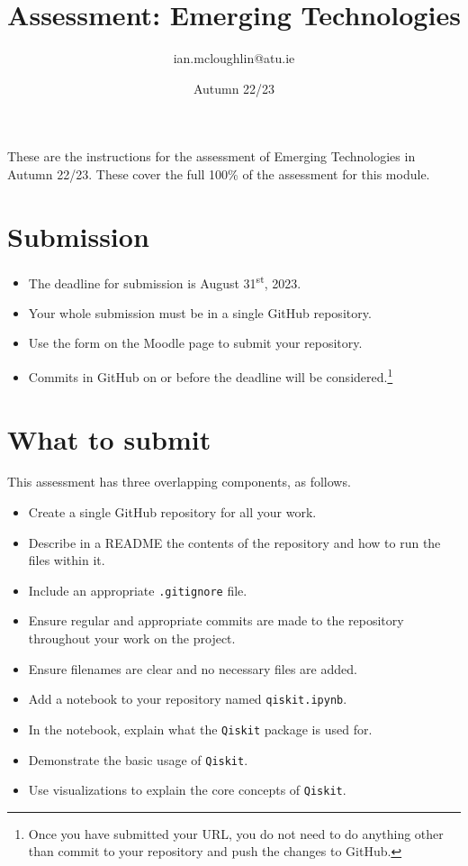 \documentclass[a4paper]{tufte-handout}
\title{Assessment: Emerging Technologies}
\author{ian.mcloughlin@atu.ie}
\date{Autumn 22/23}
\begin{document}
 
\maketitle

These are the instructions for the assessment of Emerging Technologies in Autumn 22/23.
These cover the full 100\% of the assessment for this module.


\section{Submission}

\begin{itemize}
  \item The deadline for submission is August 31\textsuperscript{st}, 2023. 
  \item Your whole submission must be in a single GitHub repository.
  \item Use the form on the Moodle page to submit your repository.
  \item Commits in GitHub on or before the deadline will be considered.\footnote{Once you have submitted your URL, you do not need to do anything other than commit to your repository and push the changes to GitHub.}
\end{itemize}


\section{What to submit}
This assessment has three overlapping components, as follows.

\begin{itemize}
  \item Create a single GitHub repository for all your work.
  \item Describe in a README the contents of the repository and how to run the files within it.
  \item Include an appropriate \texttt{.gitignore} file.
  \item Ensure regular and appropriate commits are made to the repository throughout your work on the project.
  \item Ensure filenames are clear and no necessary files are added.
\end{itemize}

\begin{itemize}
  \item Add a notebook to your repository named \texttt{qiskit.ipynb}.
  \item In the notebook, explain what the \texttt{Qiskit} package is used for.
  \item Demonstrate the basic usage of \texttt{Qiskit}.
  \item Use visualizations to explain the core concepts of \texttt{Qiskit}.
\end{itemize}
\end{document}
